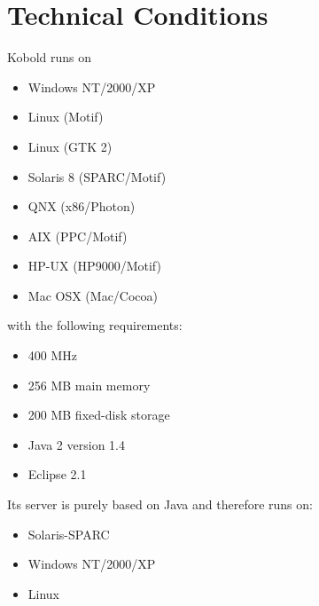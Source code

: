 \chapter{Technical Conditions}

Kobold runs on 

\begin{itemize}
\item Windows NT/2000/XP
\item Linux (Motif)
\item Linux (GTK 2)
\item Solaris 8 (SPARC/Motif)
\item QNX (x86/Photon)
\item AIX (PPC/Motif)
\item HP-UX (HP9000/Motif)
\item Mac OSX (Mac/Cocoa)
\end{itemize}

with the following requirements: \par

\begin{itemize}
\item 400 MHz
\item 256 MB main memory
\item 200 MB fixed-disk storage
\item Java 2 version 1.4
\item Eclipse 2.1
\end{itemize}
\par
\par

Its server is purely based on Java and therefore runs on:
\begin{itemize}
\item Solaris-SPARC
\item Windows NT/2000/XP
\item Linux
\end{itemize}
